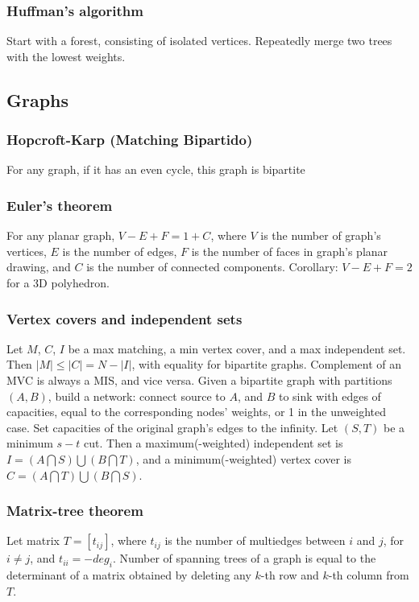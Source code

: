 \documentclass[a4paper,12pt]{article}
\newcommand\includefile[4]{
  \subsubsection{#2}
  \begin{multicols}{2}
    
  \end{multicols}
}
\begin{document}
\subsubsection{Huffman's algorithm}
Start with a forest, consisting of isolated vertices. Repeatedly merge two trees with the lowest weights.


\newpage

\subsection{Graphs}
\includefile{c++}{Hopcroft-Karp (Matching Bipartido)}{graph}{bip_match.cpp}
For any graph, if it has an even cycle, this graph is bipartite

\newpage
\subsubsection{Euler’s theorem}
For any planar graph, $V - E + F = 1 + C$, where $V$ is the number of graph’s vertices, $E$ is the number of edges, $F$ is the number of faces in graph’s planar drawing,
and $C$ is the number of connected components. Corollary: $V - E + F = 2$ for a 3D polyhedron.

\subsubsection{Vertex covers and independent sets}
Let $M$, $C$, $I$ be a max matching, a min vertex cover, and a max independent set. Then $|M| \leq |C| = N - |I|$, with equality for bipartite graphs. Complement of an MVC is always a MIS, and vice versa.
Given a bipartite graph with partitions $(A,B)$, build a network: connect source to $A$, and $B$ to sink with edges of capacities, equal to the corresponding nodes’ weights, or 1 in the unweighted case.
Set capacities of the original graph’s edges to the infinity. Let $(S,T)$ be a minimum $s-t$ cut. 
Then a maximum(-weighted) independent set is $I = (A \bigcap S) \bigcup (B \bigcap T)$, and a minimum(-weighted) vertex cover is $C = (A \bigcap T) \bigcup (B \bigcap S)$.

\subsubsection{Matrix-tree theorem}
Let matrix $T = [t_{ij}]$, where $t_{ij}$ is the number of multiedges between $i$ and $j$, for $i \neq j$, and $t_{ii} = -deg_i$.
Number of spanning trees of a graph is equal to the determinant of a matrix obtained by deleting any $k$-th row and $k$-th column from $T$.
\end{document}

